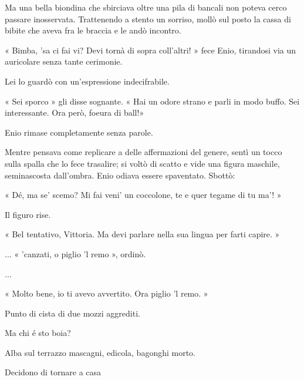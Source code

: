 Ma una bella biondina che sbirciava oltre una pila di bancali non poteva cerco passare inosservata. Trattenendo a stento un sorriso, mollò sul posto la cassa di bibite che aveva fra le braccia e le andò incontro.

« Bimba, 'sa ci fai vi? Devi tornà di sopra coll'altri! » fece Enio, tirandosi via un auricolare senza tante cerimonie.

Lei lo guardò con un'espressione indecifrabile.

« Sei sporco » gli disse sognante. « Hai un odore strano e parli in modo buffo. Sei interessante. Ora però, foeura di ball!»

Enio rimase completamente senza parole.

Mentre pensava come replicare a delle affermazioni del genere, sentì un tocco sulla spalla che lo fece trasalire; si voltò di scatto e vide una figura maschile, seminascosta dall'ombra. Enio odiava essere spaventato. Sbottò:

« Dé, ma se' scemo? Mi fai veni' un coccolone, te e quer tegame di tu ma'! »

Il figuro rise.

« Bel tentativo, Vittoria. Ma devi parlare nella sua lingua per farti capire. »

... « 'canzati, o piglio 'l remo », ordinò.

...

« Molto bene, io ti avevo avvertito. Ora piglio 'l remo. »

Punto di cista di due mozzi aggrediti.

Ma chi é sto boia?

Alba sul terrazzo mascagni, edicola, bagonghi morto.

Decidono di tornare a casa

